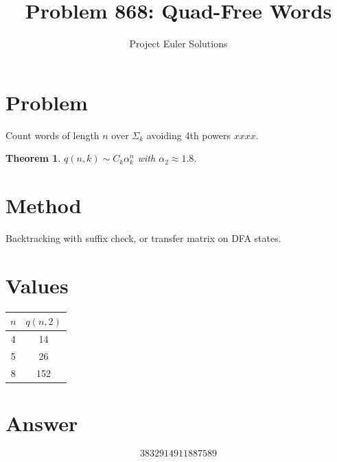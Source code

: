 \documentclass[11pt]{article}
\title{Problem 868: Quad-Free Words}
\author{Project Euler Solutions}
\date{}
\newtheorem{theorem}{Theorem}
\begin{document}
\maketitle
\section{Problem}
Count words of length $n$ over $\Sigma_k$ avoiding 4th powers $xxxx$.
\begin{theorem}
$q(n,k) \sim C_k \alpha_k^n$ with $\alpha_2 \approx 1.8$.
\end{theorem}
\section{Method}
Backtracking with suffix check, or transfer matrix on DFA states.
\section{Values}
\begin{center}
\begin{tabular}{cc} \toprule $n$ & $q(n,2)$ \\ \midrule 4 & 14 \\ 5 & 26 \\ 8 & 152 \\ \bottomrule \end{tabular}
\end{center}
\section{Answer}

\[
\boxed{3832914911887589}
\]
\end{document}
